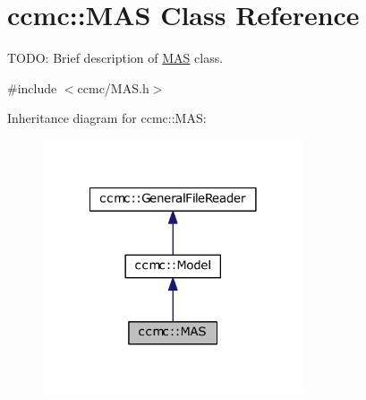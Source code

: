 \hypertarget{classccmc_1_1_m_a_s}{\section{ccmc\-:\-:M\-A\-S Class Reference}
\label{classccmc_1_1_m_a_s}
}


T\-O\-D\-O\-: Brief description of \hyperlink{classccmc_1_1_m_a_s}{M\-A\-S} class.  




{\ttfamily \#include $<$ccmc/\-M\-A\-S.\-h$>$}



Inheritance diagram for ccmc\-:\-:M\-A\-S\-:\nopagebreak
\begin{figure}[H]
\begin{center}
\leavevmode
\includegraphics[width=218pt]{classccmc_1_1_m_a_s__inherit__graph}
\end{center}
\end{figure}



